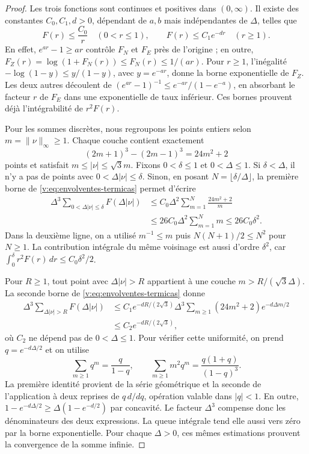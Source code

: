 \begin{proof}
Les trois fonctions sont continues et positives dans \((0,\infty)\).
Il existe des constantes \(C_0,C_1,d>0\), dépendant de \(a,b\) mais
indépendantes de \(\Delta\), telles que
\begin{equation}
 F(r)\leq\frac{C_0}{r}\quad(0<r\leq1),\qquad
 F(r)\leq C_1e^{-dr}\quad(r\geq1).
 \label{v:eq:envolventes-termicas}
\end{equation}
En effet, \(e^{ar}-1\geq ar\) contrôle \(F_N\) et \(F_E\)
près de l’origine ; en outre,
\(F_Z(r)=\log(1+F_N(r))\leq F_N(r)\leq1/(ar)\).
Pour \(r\geq1\), l’inégalité
\(-\log(1-y)\leq y/(1-y)\), avec \(y=e^{-ar}\), donne la borne
exponentielle de \(F_Z\). Les deux autres découlent de
\((e^{ar}-1)^{-1}\leq e^{-ar}/(1-e^{-a})\), en absorbant le facteur
\(r\) de \(F_E\) dans une exponentielle de taux inférieur. Ces bornes
prouvent déjà l’intégrabilité de \(r^2F(r)\).

Pour les sommes discrètes, nous regroupons les points entiers selon
\(m=\|\nu\|_\infty\geq1\). Chaque couche contient exactement
\[
 (2m+1)^3-(2m-1)^3=24m^2+2
\]
points et satisfait \(m\leq|\nu|\leq\sqrt3m\).
Fixons \(0<\delta\leq1\) et \(0<\Delta\leq1\).
Si \(\delta<\Delta\), il n’y a pas de points avec
\(0<\Delta|\nu|\leq\delta\). Sinon, en posant
\(N=\lfloor\delta/\Delta\rfloor\), la première borne de
\eqref{v:eq:envolventes-termicas} permet d’écrire
\begin{align*}
 \Delta^3\!\sum_{0<\Delta|\nu|\leq\delta}F(\Delta|\nu|)
 &\leq C_0\Delta^2\sum_{m=1}^{N}\frac{24m^2+2}{m}\\
 &\leq26C_0\Delta^2\sum_{m=1}^{N}m
 \leq26C_0\delta^2.
\end{align*}
Dans la deuxième ligne, on a utilisé \(m^{-1}\leq m\) puis
\(N(N+1)/2\leq N^2\) pour \(N\geq1\).
La contribution intégrale du même voisinage est aussi d’ordre
\(\delta^2\), car
\(\int_0^\delta r^2F(r)\,dr\leq C_0\delta^2/2\).

Pour \(R\geq1\), tout point avec \(\Delta|\nu|>R\) appartient
à une couche \(m>R/(\sqrt3\Delta)\). La seconde borne de
\eqref{v:eq:envolventes-termicas} donne
\begin{align*}
 \Delta^3\!\sum_{\Delta|\nu|>R}F(\Delta|\nu|)
 &\leq C_1e^{-dR/(2\sqrt3)}
 \Delta^3\sum_{m\geq1}(24m^2+2)e^{-d\Delta m/2}\\
 &\leq C_2e^{-dR/(2\sqrt3)},
\end{align*}
où \(C_2\) ne dépend pas de \(0<\Delta\leq1\). Pour vérifier
cette uniformité, on prend \(q=e^{-d\Delta/2}\) et on utilise
\[
 \sum_{m\geq1}q^m=\frac{q}{1-q},\qquad
 \sum_{m\geq1}m^2q^m=\frac{q(1+q)}{(1-q)^3}.
\]
La première identité provient de la série géométrique et la seconde de
l’application à deux reprises de \(q\,d/dq\), opération valable dans \(|q|<1\).
En outre,
\(1-e^{-d\Delta/2}\geq\Delta(1-e^{-d/2})\) par concavité.
Le facteur \(\Delta^3\) compense donc les dénominateurs des
deux expressions. La queue intégrale tend elle aussi vers zéro par la
borne exponentielle. Pour chaque \(\Delta>0\), ces mêmes estimations
prouvent la convergence de la somme infinie.


\end{proof}

